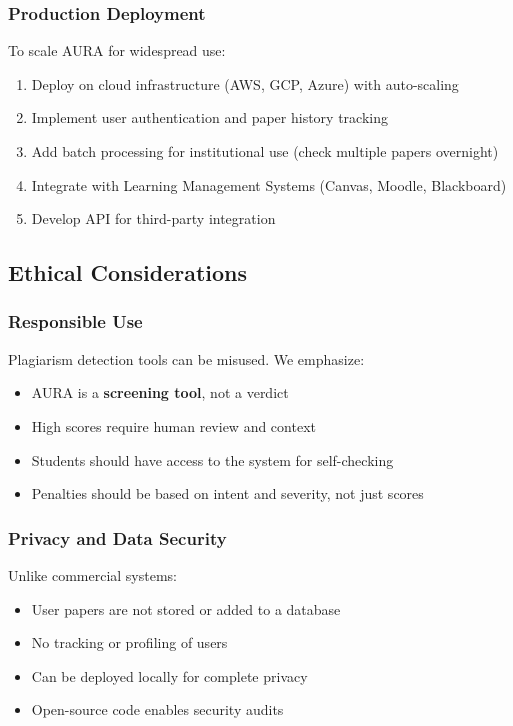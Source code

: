 \documentclass[conference]{IEEEtran}
\begin{document}
\subsubsection{Production Deployment}
To scale AURA for widespread use:
\begin{enumerate}
    \item Deploy on cloud infrastructure (AWS, GCP, Azure) with auto-scaling
    \item Implement user authentication and paper history tracking
    \item Add batch processing for institutional use (check multiple papers overnight)
    \item Integrate with Learning Management Systems (Canvas, Moodle, Blackboard)
    \item Develop API for third-party integration
\end{enumerate}

\subsection{Ethical Considerations}

\subsubsection{Responsible Use}
Plagiarism detection tools can be misused. We emphasize:
\begin{itemize}
    \item AURA is a \textbf{screening tool}, not a verdict
    \item High scores require human review and context
    \item Students should have access to the system for self-checking
    \item Penalties should be based on intent and severity, not just scores
\end{itemize}

\subsubsection{Privacy and Data Security}
Unlike commercial systems:
\begin{itemize}
    \item User papers are not stored or added to a database
    \item No tracking or profiling of users
    \item Can be deployed locally for complete privacy
    \item Open-source code enables security audits
\end{itemize}
\end{document}

